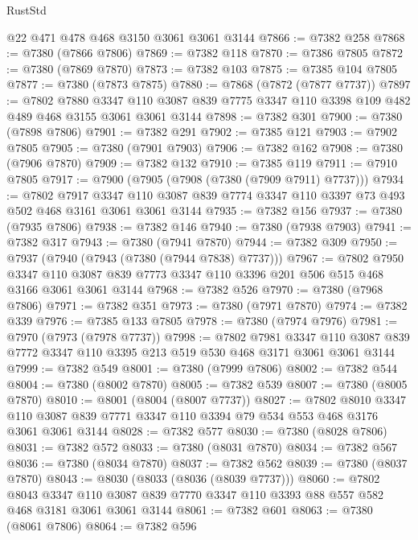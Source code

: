 \begin{lexlean}{RustStd}
\begin{coremodule}
    @22
    @471
    @478
    @468
    @3150
    @3061
    @3061
    @3144
@7866 := @7382 @258
@7868 := @7380 (@7866 @7806)
@7869 := @7382 @118
@7870 := @7386 @7805
@7872 := @7380 (@7869 @7870)
@7873 := @7382 @103
@7875 := @7385 @104 @7805
@7877 := @7380 (@7873 @7875)
@7880 := @7868 (@7872 (@7877 @7737))
@7897 := @7802
    @7880
    @3347
    @110
    @3087
    @839
    @7775
    @3347
    @110
    @3398
    @109
    @482
    @489
    @468
    @3155
    @3061
    @3061
    @3144
@7898 := @7382 @301
@7900 := @7380 (@7898 @7806)
@7901 := @7382 @291
@7902 := @7385 @121
@7903 := @7902 @7805
@7905 := @7380 (@7901 @7903)
@7906 := @7382 @162
@7908 := @7380 (@7906 @7870)
@7909 := @7382 @132
@7910 := @7385 @119
@7911 := @7910 @7805
@7917 := @7900 (@7905 (@7908 (@7380 (@7909 @7911) @7737)))
@7934 := @7802
    @7917
    @3347
    @110
    @3087
    @839
    @7774
    @3347
    @110
    @3397
    @73
    @493
    @502
    @468
    @3161
    @3061
    @3061
    @3144
@7935 := @7382 @156
@7937 := @7380 (@7935 @7806)
@7938 := @7382 @146
@7940 := @7380 (@7938 @7903)
@7941 := @7382 @317
@7943 := @7380 (@7941 @7870)
@7944 := @7382 @309
@7950 := @7937 (@7940 (@7943 (@7380 (@7944 @7838) @7737)))
@7967 := @7802
    @7950
    @3347
    @110
    @3087
    @839
    @7773
    @3347
    @110
    @3396
    @201
    @506
    @515
    @468
    @3166
    @3061
    @3061
    @3144
@7968 := @7382 @526
@7970 := @7380 (@7968 @7806)
@7971 := @7382 @351
@7973 := @7380 (@7971 @7870)
@7974 := @7382 @339
@7976 := @7385 @133 @7805
@7978 := @7380 (@7974 @7976)
@7981 := @7970 (@7973 (@7978 @7737))
@7998 := @7802
    @7981
    @3347
    @110
    @3087
    @839
    @7772
    @3347
    @110
    @3395
    @213
    @519
    @530
    @468
    @3171
    @3061
    @3061
    @3144
@7999 := @7382 @549
@8001 := @7380 (@7999 @7806)
@8002 := @7382 @544
@8004 := @7380 (@8002 @7870)
@8005 := @7382 @539
@8007 := @7380 (@8005 @7870)
@8010 := @8001 (@8004 (@8007 @7737))
@8027 := @7802
    @8010
    @3347
    @110
    @3087
    @839
    @7771
    @3347
    @110
    @3394
    @79
    @534
    @553
    @468
    @3176
    @3061
    @3061
    @3144
@8028 := @7382 @577
@8030 := @7380 (@8028 @7806)
@8031 := @7382 @572
@8033 := @7380 (@8031 @7870)
@8034 := @7382 @567
@8036 := @7380 (@8034 @7870)
@8037 := @7382 @562
@8039 := @7380 (@8037 @7870)
@8043 := @8030 (@8033 (@8036 (@8039 @7737)))
@8060 := @7802
    @8043
    @3347
    @110
    @3087
    @839
    @7770
    @3347
    @110
    @3393
    @88
    @557
    @582
    @468
    @3181
    @3061
    @3061
    @3144
@8061 := @7382 @601
@8063 := @7380 (@8061 @7806)
@8064 := @7382 @596

\end{coremodule}
\end{lexlean}
